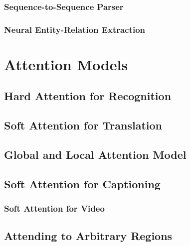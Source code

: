 			\subsubsection{Sequence-to-Sequence Parser} %

			\subsubsection{Neural Entity-Relation Extraction} %

	\section{Attention Models} %

		\subsection{Hard Attention for Recognition} %

		\subsection{Soft Attention for Translation} %

		\subsection{Global and Local Attention Model} %

		\subsection{Soft Attention for Captioning} %

			\subsubsection{Soft Attention for Video} %

		\subsection{Attending to Arbitrary Regions} %

